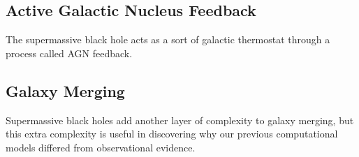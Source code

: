 \documentclass[12pt]{article}
\begin{document}
\subsection*{\bf Active Galactic Nucleus Feedback}
The supermassive black hole acts as a sort of galactic thermostat through a
process called AGN feedback.

\subsection *{\bf Galaxy Merging}
Supermassive black holes add another layer of complexity to galaxy merging, but
this extra complexity is useful in discovering why our previous computational
models differed from observational evidence.
\end{document}
